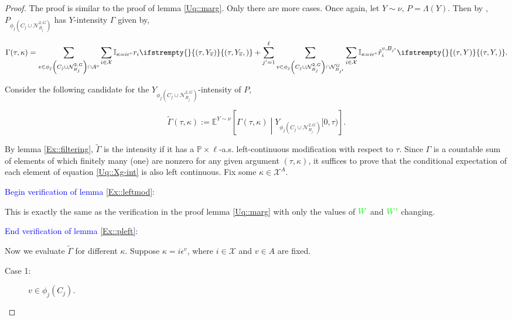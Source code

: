 \documentclass[12pt]{article}
\newcommand{\skipLine}{\vspace{12pt}}
\newcommand{\mb}{\mathbb}
\newcommand{\mc}{\mathcal}
\newcommand{\ov}{\overline}
\newcommand{\ep}{\epsilon}
\newcommand{\tb}{\textcolor{blue}}
\newcommand{\tg}{\textcolor{green}}
\newcommand{\ind}{\hspace{24pt}}
\newcommand{\pr}{\mb{P}}							%
\newcommand{\exmu}[2]{\mb{E}^{#1}\left[#2\right]}	%
\newcommand{\defeq}{:=}								%
\newcommand{\sta}{\mc{X}}							%
\newcommand{\gneigh}[2]{\mc{N}^{#1}_{#2}}			%
\newcommand{\dgneigh}[2]{\mc{N}^{2,#1}_{#2}}		%
\newcommand{\cl}[1]{\ov{#1}}						%
\newcommand{\Sm}{\ell}								%
\newcommand{\rate}{r}								%
\newcommand{\vind}[1]{_{#1}}						%
\newcommand{\tmi}[1]{#1}							%
\newcommand{\stpara}[1]{_{#1}}						%
\newcommand{\psize}{\ell}							%
\newcommand{\tmepro}[3]{
\ifstrempty{#3}{
	\left(#1,#2\right)}{
	\left(#1,#2,#3\right)}}							%
\newcommand{\Xg}{Y}									%
\newcommand{\brate}{\alt{\rate}}					%
\newcommand{\inte}[1]{{#1}^\mathrm{o}}				%
\newcommand{\alt}[1]{\tilde{#1}}					%
\newcommand{\pmap}{\Lambda}							%
\newcommand{\rt}{\tau}								%
\renewcommand{\mark}{\kappa}						%
\newcommand{\ratee}{\Gamma}							%
\newcommand{\cratee}{\alt{\ratee}}					%
\newcommand{\rp}{P}									%
\newcommand{\mm}{\nu}								%
\newcommand{\ev}[1]{\ep^{#1}}						%
\newcommand{\vjpara}[2]{^{#1,#2}}					%
\begin{document}
\begin{proof}
The proof is similar to the proof of lemma \ref{Uq::marg}. Only there are more cases. Once again, let \(\Xg \sim \mm\), \(\rp = \pmap(\Xg)\). Then by \cite[Exercise 14.7.1]{DalVer08}, \(\rp\vind{\phi_j\left(C_j\cup\dgneigh{G}{B_j}\right)}\) has \(\Xg\)-intensity \(\ratee\) given by,

\begin{equation}
\ratee(\rt,\mark) = \sum_{v \in\phi_j\left(C_j\cup\dgneigh{G}{B_j}\right)\cap\inte{A}} \sum_{i \in \sta} \mb{I}_{\mark = i\ev{v}} \rate\stpara{i}\tmepro{\rt}{\Xg\vind{\cl{v}}}{} + \sum_{j' = 1}^\psize\sum_{v \in \phi_j\left(C_j\cup\dgneigh{G}{B_j}\right)\cap\gneigh{G}{B_{j'}}}\sum_{i\in \sta} \mb{I}_{\mark = i\ev{v}} \brate\vjpara{v}{B_{j'}}\stpara{i}\tmepro{\rt}{\Xg}{}.
\label{Uq::Xg-int2}
\end{equation}

Consider the following candidate for the \(\Xg\vind{\phi_j\left(C_j\cup\dgneigh{G}{B_j}\right)}\)-intensity of \(\rp\), 

\[\cratee(\rt,\mark) \defeq \exmu{\Xg \sim \mm}{\ratee(\rt,\mark)\middle|\Xg\vind{\phi_j\left(C_j\cup\dgneigh{G}{B_j}\right)}\tmi{[0,\rt)}}.\]

By lemma \ref{Ex::filtering}, \(\cratee\) is the intensity if it has a \(\pr\times\Sm\)-a.s. left-continuous modification with respect to \(\rt\). Since \(\ratee\) is a countable sum of elements of which finitely many (one) are nonzero for any given argument \((\rt,\mark)\), it suffices to prove that the conditional expectation of each element of equation \eqref{Uq::Xg-int} is also left continuous. Fix some \(\mark \in \sta^A\).

\skipLine

\tb{Begin verification of lemma \ref{Ex::leftmod}:}

\skipLine

This is exactly the same as the verification in the proof lemma \ref{Uq::marg} with only the values of \(\tg{W}\) and \(\tg{W'}\) changing.

\skipLine

\tb{End verification of lemma \ref{Ex::pleft}:}

\skipLine

\ind Now we evaluate \(\cratee\) for different \(\kappa\). Suppose \(\kappa = i\ev{v}\), where \(i \in \sta\) and \(v\in A\) are fixed.

\begin{description}
\item[Case 1: ] \(v \in \phi_j(C_j)\).


\end{description}
\end{proof}
\end{document}
